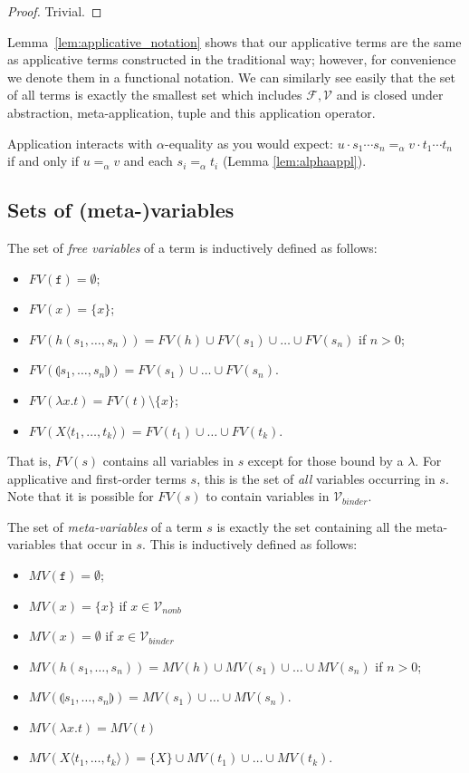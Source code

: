 \documentclass{lmcs}
\theoremstyle{theorem}\newtheorem{theorem}{Theorem}
\theoremstyle{theorem}\newtheorem{lemma}[theorem]{Lemma}
\theoremstyle{theorem}\newtheorem{corollary}[theorem]{Corollary}
\theoremstyle{definition}\newtheorem{definition}[theorem]{Definition}
\theoremstyle{definition}\newtheorem{example}[theorem]{Example}
\newcommand{\F}{\mathcal{F}}
\newcommand{\V}{\mathcal{V}}
\newcommand{\Vfree}{\mathcal{V}_{\mathit{nonb}}}
\newcommand{\Vbound}{\mathcal{V}_{\mathit{binder}}}
\newcommand{\FV}{\mathit{FV}}
\newcommand{\FMV}{\mathit{MV}}
\newcommand{\identifier}[1]{\mathtt{#1}}
\newcommand{\afun}{\identifier{f}}
\newcommand{\avar}{x}
\newcommand{\Avar}{X}
\newcommand{\abs}[2]{\lambda #1.#2}
\newcommand{\meta}[2]{#1\langle#2\rangle}
\newcommand{\tuple}[2]{\llparenthesis #1,\dots,#2 \rrparenthesis}
\begin{document}
\begin{proof}
Trivial.
\end{proof}

Lemma~\ref{lem:applicative_notation} shows that our applicative terms are the
same as applicative terms constructed in the traditional way; however, for
convenience we denote them in a functional notation.
We can similarly see easily that the set of all terms is exactly the smallest
set which includes $\F,\V$ and is closed under abstraction, meta-application,
tuple and this application operator.

Application interacts with $\alpha$-equality as you would expect: $u \cdot s_1
\cdots s_n =_\alpha v \cdot t_1 \cdots t_n$ if and only if $u =_\alpha v$ and
each $s_i =_\alpha t_i$ (Lemma \ref{lem:alphaappl}).

\subsection{Sets of (meta-)variables}
The set of \emph{free variables} of a term is inductively defined as follows:
\begin{itemize}
\item $\FV(\afun) = \emptyset$;
\item $\FV(\avar) = \{ \avar \}$;
\item $\FV(h(s_1,\dots,s_n)) = \FV(h) \cup \FV(s_1) \cup \dots \cup \FV(s_n)$ if
  $n > 0$;
\item $\FV(\tuple{s_1}{s_n}) = \FV(s_1) \cup \dots \cup \FV(s_n)$.
\item $\FV(\abs{\avar}{t}) = \FV(t) \setminus \{ \avar \}$;
\item $\FV(\meta{\Avar}{t_1,\dots,t_k}) = \FV(t_1) \cup \dots \cup \FV(t_k)$.
\end{itemize}
That is, $\FV(s)$ contains all variables in $s$ except for those bound by a
$\lambda$.
For applicative and first-order terms $s$, this is the set of \emph{all}
variables occurring in $s$.
Note that it is possible for $\FV(s)$ to contain variables in $\Vbound$.

The set of \emph{meta-variables} of a term $s$ is exactly the set containing all
the meta-variables that occur in $s$.  This is inductively defined as follows:
\begin{itemize}
\item $\FMV(\afun) = \emptyset$;
\item $\FMV(\avar) = \{ \avar \}$ if $\avar \in \Vfree$
\item $\FMV(\avar) = \emptyset$ if $\avar \in \Vbound$
\item $\FMV(h(s_1,\dots,s_n)) = \FMV(h) \cup \FMV(s_1) \cup \dots \cup
  \FMV(s_n)$ if $n > 0$;
\item $\FMV(\tuple{s_1}{s_n}) = \FMV(s_1) \cup \dots \cup \FMV(s_n)$.
\item $\FMV(\abs{\avar}{t}) = \FMV(t)$
\item $\FMV(\meta{\Avar}{t_1,\dots,t_k}) = \{ \Avar \} \cup \FMV(t_1) \cup
  \dots \cup \FMV(t_k)$.
\end{itemize}
\end{document}
